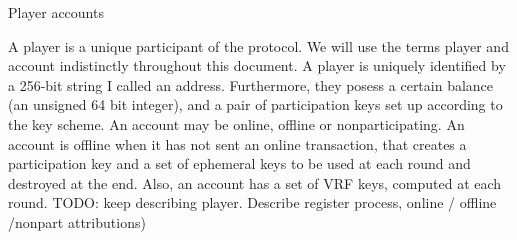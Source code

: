 \documentclass[10pt,a4paper]{article}
\begin{document}
\begin{section}{Player accounts}

A player is a unique participant of the protocol. We will
use the terms player and account indistinctly throughout this document.
A player is uniquely identified by a 256-bit string I called an address.
Furthermore, they posess a certain balance (an unsigned 64 bit integer), 
and a pair of participation keys set up according to the key scheme. An account may be online, 
offline or nonparticipating.
An account is offline when it has not sent an online transaction, that creates
a participation key and a set of ephemeral keys to be used at each round and
destroyed at the end.
Also, an account has a set of VRF keys, computed at each round.
TODO: keep describing player. Describe register process, online / offline /nonpart attributions)

\end{section}
\end{document}
